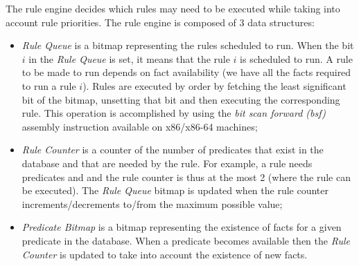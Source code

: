 The rule engine decides which rules may need to be executed while taking into
account rule priorities. The rule engine is composed of 3 data structures:

\begin{itemize}

   \item \emph{Rule Queue} is a bitmap representing the rules scheduled to run.
      When the bit $i$ in the \emph{Rule Queue} is set, it means that the rule
      $i$ is scheduled to run. A rule to be made to run depends on fact
      availability (we have all the facts required to run a rule $i$). Rules are
      executed by order by fetching the least significant bit of the bitmap,
      unsetting that bit and then executing the corresponding rule. This
      operation is accomplished by using the \emph{bit scan forward (bsf)}
      assembly instruction available on x86/x86-64 machines;

   \item \emph{Rule Counter} is a counter of the number of predicates that exist
      in the database and that are needed by the rule. For example, a rule
       needs predicates  and  and the
      rule counter is thus at the most 2 (where the rule can be executed). The
      \emph{Rule Queue} bitmap is updated when the rule counter
      increments/decrements to/from the maximum possible value;

   \item \emph{Predicate Bitmap} is a bitmap representing the existence of facts
      for a given predicate in the database. When a predicate becomes available
      then the \emph{Rule Counter} is updated to take into account the existence
      of new facts.

\end{itemize}


